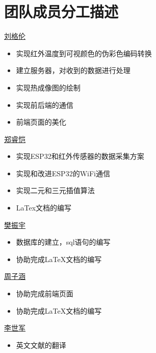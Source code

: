 \chapter{团队成员分工描述}

\underline{刘格伦}
\begin{itemize}
    \item 实现红外温度到可视颜色的伪彩色编码转换
    \item 建立服务器，对收到的数据进行处理
    \item 实现热成像图的绘制
    \item 实现前后端的通信
    \item 前端页面的美化
    \end{itemize}

\underline{郑睿恺}
\begin{itemize}
    \item 实现ESP32和红外传感器的数据采集方案
    \item 实现和改进ESP32的WiFi通信
    \item 实现二元和三元插值算法
    \item LaTex文档的编写
    \end{itemize}

\underline{樊振宇}
\begin{itemize}
    \item 数据库的建立，sql语句的编写
    \item 协助完成LaTeX文档的编写
    \end{itemize}
    
    \underline{周子涵}
\begin{itemize}
    \item 协助完成前端页面
    \item 协助完成LaTeX文档的编写
    \end{itemize}
    
    \underline{李世军}
\begin{itemize}
    \item 英文文献的翻译
    \end{itemize}








